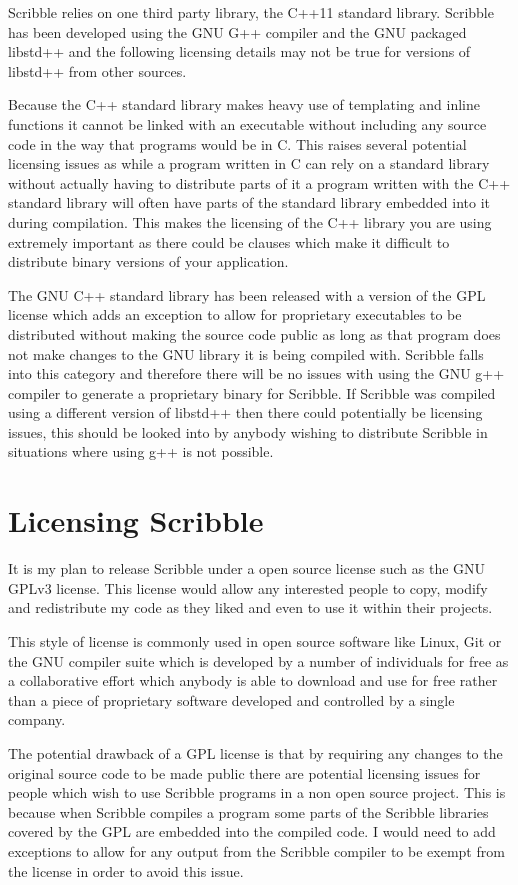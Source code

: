 \documentclass[]{final_report}
\begin{document}
Scribble relies on one third party library, the C++11 standard library. Scribble has been developed using the GNU G++ compiler and the GNU packaged libstd++ and the following licensing details may not be true for  versions of libstd++ from other sources.

Because the C++ standard library makes heavy use of templating and inline functions it cannot be linked with an executable without including any source code in the way that programs would be in C. This raises several potential licensing issues as while a program written in C can rely on a standard library without actually having to distribute parts of it a program written with the C++ standard library will often have parts of the standard library embedded into it during compilation. This makes the licensing of the C++ library you are using extremely important as there could be clauses which make it difficult to distribute binary versions of your application.

The GNU C++ standard library has been released with a version of the GPL license which adds an exception to allow for proprietary executables to be distributed without making the source code public as long as that program does not make changes to the GNU library it is being compiled with. Scribble falls into this category and therefore there will be no issues with using the GNU g++ compiler to generate a proprietary binary for Scribble. If Scribble was compiled using a different version of libstd++ then there could potentially be licensing issues, this should be looked into by anybody wishing to distribute Scribble in situations where using g++ is not possible.

\section{Licensing Scribble}

It is my plan to release Scribble under a open source license such as the GNU GPLv3 license. This license would allow any interested people to copy, modify and redistribute my code as they liked and even to use it within their projects.

This style of license is commonly used in open source software like Linux, Git or the GNU compiler suite which is developed by a number of individuals for free as a collaborative effort which anybody is able to download and use for free rather than a piece of proprietary software developed and controlled by a single company.

The potential drawback of a GPL license is that by requiring any changes to the original source code to be made public there are potential licensing issues for people which wish to use Scribble programs in a non open source project. This is because when Scribble compiles a program some parts of the Scribble libraries covered by the GPL are embedded into the compiled code. I would need to add exceptions to allow for any output from the Scribble compiler to be exempt from the license in order to avoid this issue.
\end{document}

